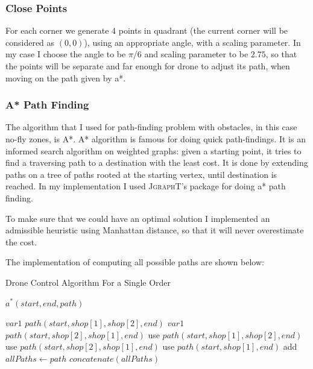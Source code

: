 \documentclass[a4paper,article,fontsize=15pt]{scrartcl}
\numberwithin{equation}{section}		%
\numberwithin{figure}{section}			%
\numberwithin{table}{section}				%
\begin{document}
\subsubsection{Close Points}

For each corner we generate 4 points in quadrant (the current corner will be considered as $(0,0)$), using an appropriate angle, with a scaling parameter. In my case I choose the angle to be $\pi/6$ and scaling parameter to be $2.75$, so that the points will be separate and far enough for drone to adjust its path, when moving on the path given by a*.

\subsubsection{A* Path Finding}

The algorithm that I used for path-finding problem with obstacles, in this case no-fly zones, is A*. A* algorithm is famous for doing quick path-findings.  It is an informed search algorithm on weighted graphs: given a starting point, it tries to find a traversing path to a destination with the least cost. It is done by extending paths on a tree of paths rooted at the starting vertex, until destination is reached.\cite{4082128} In my implementation I used \textsc{JgraphT}'s\cite{JgraphT} package for doing a* path finding. 

To make sure that we could have an optimal solution I implemented an admissible heuristic using Manhattan distance, so that it will never overestimate the cost.


The implementation of computing all possible paths are shown below:
\begin{algorithm}
	\caption{Drone Control Algorithm For a Single Order} 
	\begin{algorithmic}[1]
				\State $a^*(start,end, path)$
			\EndFor
			
			    \State $var1$ \gets $path(start, shop[1], shop[2], end)$ 
			    \State $var1$ \gets $path(start, shop[2], shop[1], end)$
			    \State use $path(start, shop[1], shop[2], end)$
			    \Else
			    \State use $path(start, shop[2], shop[1], end)$
			    \EndIf
			\Else
			    \State use $path(start, shop[1], end)$
            \EndIf
            add $allPaths \longleftarrow path$
		\EndFor
	\State $concatenate(allPaths)$
	\end{algorithmic} 
\end{algorithm}
\end{document}
